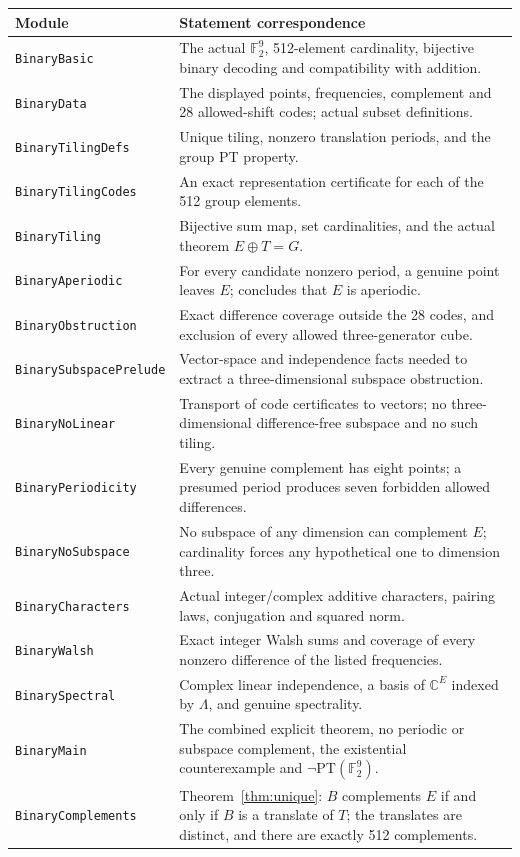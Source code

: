 \documentclass[11pt]{article}
\theoremstyle{definition}\newtheorem{definition}[theorem]{Definition}
\theoremstyle{remark}\newtheorem{remark}[theorem]{Remark}
\newcommand{\F}{\mathbb F}
\newcommand{\C}{\mathbb C}
\newcommand{\PT}{\mathrm{PT}}
\newcommand{\modname}[1]{\texttt{\footnotesize #1}}
\begin{document}
\begingroup\small
\begin{longtable}{@{}p{43mm}p{109mm}@{}}
\toprule
Module&Statement correspondence\\
\midrule
\endhead
\modname{BinaryBasic}&The actual $\F_2^9$, 512-element cardinality, bijective binary decoding and compatibility with addition.\\
\modname{BinaryData}&The displayed points, frequencies, complement and 28 allowed-shift codes; actual subset definitions.\\
\modname{BinaryTilingDefs}&Unique tiling, nonzero translation periods, and the group PT property.\\
\modname{BinaryTilingCodes}&An exact representation certificate for each of the 512 group elements.\\
\modname{BinaryTiling}&Bijective sum map, set cardinalities, and the actual theorem $E\oplus T=G$.\\
\modname{BinaryAperiodic}&For every candidate nonzero period, a genuine point leaves $E$; concludes that $E$ is aperiodic.\\
\modname{BinaryObstruction}&Exact difference coverage outside the 28 codes, and exclusion of every allowed three-generator cube.\\
\modname{BinarySubspacePrelude}&Vector-space and independence facts needed to extract a three-dimensional subspace obstruction.\\
\modname{BinaryNoLinear}&Transport of code certificates to vectors; no three-dimensional difference-free subspace and no such tiling.\\
\modname{BinaryPeriodicity}&Every genuine complement has eight points; a presumed period produces seven forbidden allowed differences.\\
\modname{BinaryNoSubspace}&No subspace of any dimension can complement $E$; cardinality forces any hypothetical one to dimension three.\\
\modname{BinaryCharacters}&Actual integer/complex additive characters, pairing laws, conjugation and squared norm.\\
\modname{BinaryWalsh}&Exact integer Walsh sums and coverage of every nonzero difference of the listed frequencies.\\
\modname{BinarySpectral}&Complex linear independence, a basis of $\C^E$ indexed by $\Lambda$, and genuine spectrality.\\
\modname{BinaryMain}&The combined explicit theorem, no periodic or subspace complement, the existential counterexample and $\neg\PT(\F_2^9)$.\\
\modname{BinaryComplements}&Theorem~\ref{thm:unique}: $B$ complements $E$ if and only if $B$ is a translate of $T$; the translates are distinct, and there are exactly 512 complements.\\
\bottomrule
\end{longtable}
\endgroup
\end{document}
